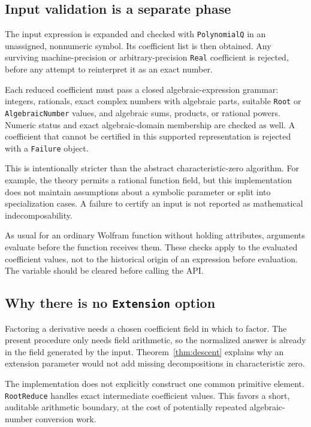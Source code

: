 \documentclass[11pt,letterpaper]{article}
\theoremstyle{definition}
\theoremstyle{remark}
\newcommand{\wt}[1]{\texttt{#1}}
\begin{document}
\subsection{Input validation is a separate phase}
The input expression is expanded and checked with \wt{PolynomialQ} in
an unassigned, nonnumeric symbol. Its coefficient list is then obtained.
Any surviving machine-precision or arbitrary-precision \wt{Real}
coefficient is rejected, before any attempt to reinterpret it as an
exact number.

Each reduced coefficient must pass a closed algebraic-expression grammar:
integers, rationals, exact complex numbers with algebraic parts, suitable
\wt{Root} or \wt{AlgebraicNumber} values, and algebraic sums, products,
or rational powers. Numeric status and exact algebraic-domain membership
are checked as well. A coefficient that cannot be certified in this
supported representation is rejected with a \wt{Failure} object.

This is intentionally stricter than the abstract characteristic-zero
algorithm. For example, the theory permits a rational function field,
but this implementation does not maintain assumptions about a symbolic
parameter or split into specialization cases. A failure to certify an
input is not reported as mathematical indecomposability.

As usual for an ordinary Wolfram function without holding attributes,
arguments evaluate before the function receives them. These checks apply
to the evaluated coefficient values, not to the historical origin of
an expression before evaluation. The variable should be cleared before
calling the API.

\subsection{Why there is no \texttt{Extension} option}
Factoring a derivative needs a chosen coefficient field in which to
factor. The present procedure only needs field arithmetic, so the
normalized answer is already in the field generated by the input.
Theorem~\ref{thm:descent} explains why an extension parameter would not
add missing decompositions in characteristic zero.

The implementation does not explicitly construct one common primitive
element. \wt{RootReduce} handles exact intermediate coefficient values.
This favors a short, auditable arithmetic boundary, at the cost of
potentially repeated algebraic-number conversion work.
\end{document}
